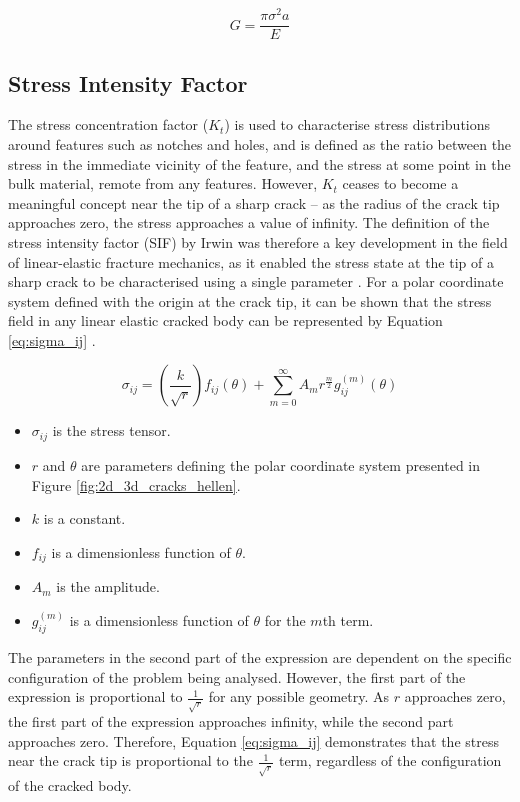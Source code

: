 \begin{equation}
	G = \frac{\pi \sigma^2 a}{E}\label{eq:strain_energy}
\end{equation}

\newpage
\subsection{Stress Intensity Factor}\label{sec:sif}

The stress concentration factor ($K_t$) is used to characterise stress distributions around features such as notches and holes, and is defined as the ratio between the stress in the immediate vicinity of the feature, and the stress at some point in the bulk material, remote from any features. However, $K_t$ ceases to become a meaningful concept near the tip of a sharp crack -- as the radius of the crack tip approaches zero, the stress approaches a value of infinity. The definition of the stress intensity factor (SIF) by Irwin was therefore a key development in the field of linear-elastic fracture mechanics, as it enabled the stress state at the tip of a sharp crack to be characterised using a single parameter \cite{irwin_analysis_1957}. For a polar coordinate system defined with the origin at the crack tip, it can be shown that the stress field in any linear elastic cracked body can be represented by Equation \ref{eq:sigma_ij} \cite{anderson_fracture_2017}.

\begin{equation}
	\sigma_{ij} = \left(\frac{k}{\sqrt{r}}\right) f_{ij}(\theta) + \sum_{m=0}^{\infty} A_m r^{\frac{m}{2}} g_{ij}^{(m)}(\theta)\label{eq:sigma_ij}
\end{equation}

\begin{itemize}
	\item $\sigma_{ij}$ is the stress tensor.
	\item $r$ and $\theta$ are parameters defining the polar coordinate system presented in Figure \ref{fig:2d_3d_cracks_hellen}.
	\item $k$ is a constant.
	\item $f_{ij}$ is a dimensionless function of $\theta$.
	\item $A_m$ is the amplitude.
	\item $g_{ij}^{(m)}$ is a dimensionless function of $\theta$ for the $m$th term.
\end{itemize}

The parameters in the second part of the expression are dependent on the specific configuration of the problem being analysed. However, the first part of the expression is proportional to $\frac{1}{\sqrt{r}}$ for any possible geometry. As $r$ approaches zero, the first part of the expression approaches infinity, while the second part approaches zero. Therefore, Equation \ref{eq:sigma_ij} demonstrates that the stress near the crack tip is proportional to the $\frac{1}{\sqrt{r}}$ term, regardless of the configuration of the cracked body.


